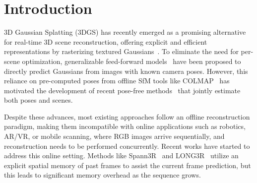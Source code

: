 \section{Introduction}
3D Gaussian Splatting (3DGS) has recently emerged as a promising alternative for real-time 3D scene reconstruction, offering explicit and efficient representations by rasterizing textured Gaussians~\cite{kerbl20233d, yu2024mip, ren2024octree, luiten2024dynamic}. To eliminate the need for per-scene optimization, generalizable feed-forward models~\cite{chen2024mvsplat, charatan2024pixelsplat, zou2024triplane, zheng2024gps, wewer2024latentsplat, li2024ggrt} have been proposed to directly predict Gaussians from images with known camera poses. However, this reliance on pre-computed poses from offline SfM tools like COLMAP~\cite{schonberger2016structure} has motivated the development of recent pose-free methods~\cite{wang2024dust3r, leroy2024grounding, ye2024no, zhang2025flare} that jointly estimate both poses and scenes.

Despite these advances, most existing approaches follow an offline reconstruction paradigm, making them incompatible with online applications such as robotics, AR/VR, or mobile scanning, where RGB images arrive sequentially, and reconstruction needs to be performed concurrently. Recent works have started to address this online setting. Methods like Spann3R~\cite{wang20243d} and LONG3R~\cite{chen2025long3r} utilize an explicit spatial memory of past frames to assist the current frame prediction, but this leads to significant memory overhead as the sequence grows. 

